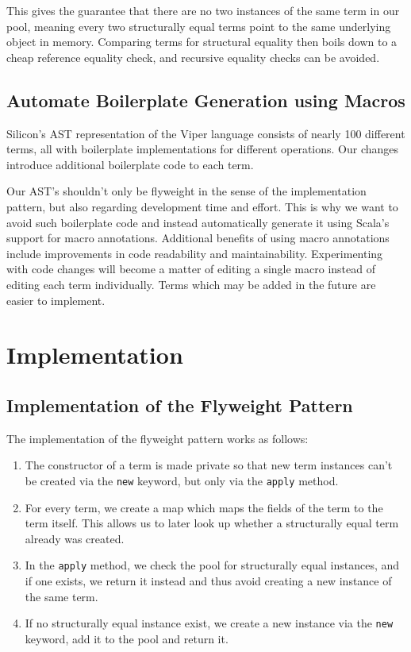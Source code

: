 \documentclass[11pt]{article}
\begin{document}
    This gives the guarantee that there are no two instances of the
    same term in our pool, meaning every two structurally equal terms point to the same
    underlying object in memory. Comparing terms for structural equality then boils
    down to a cheap reference equality check, and recursive equality checks can be avoided.

    \subsection{Automate Boilerplate Generation using Macros} \label{boilerplate-generation-using-macros}

    Silicon's AST representation of the Viper language consists of nearly 100 different terms,
    all with boilerplate implementations for different operations.
    Our changes introduce additional boilerplate code to each term.

    Our AST's shouldn't only be flyweight in the sense of the implementation pattern, but also
    regarding development time and effort. This is why we want to avoid such boilerplate
    code and instead automatically generate it using Scala's support for macro annotations.
    Additional benefits of using macro annotations include improvements in code
    readability and maintainability. Experimenting with code changes will become a matter
    of editing a single macro instead of editing each term individually.
    Terms which may be added in the future are easier to implement.

    \newpage
    \section{Implementation}

    \subsection{Implementation of the Flyweight Pattern} \label{implementation-flyweight-pattern}

    The implementation of the flyweight pattern works as follows:

    \begin{enumerate}
        \item The constructor of a term is made private so that new term instances can't be created via
            the \texttt{new} keyword, but only via the \texttt{apply} method.
        \item For every term, we create a map which maps the fields of the term to the term itself.
            This allows us to later look up whether a structurally equal term already was created.
        \item In the \texttt{apply} method, we check the pool for structurally equal instances,
            and if one exists, we return it instead and thus avoid creating a new instance of the
            same term.
        \item If no structurally equal instance exist, we create a new instance via the \texttt{new}
            keyword, add it to the pool and return it.
    \end{enumerate}
\end{document}
